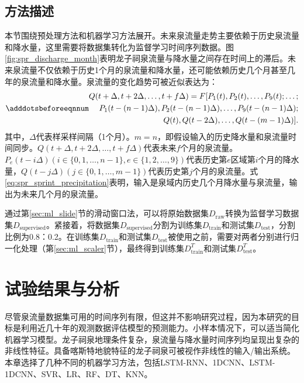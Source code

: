 \subsection{方法描述}\label{sec:spr_method}

本节围绕预处理方法和机器学习方法展开。未来泉流量走势主要依赖于历史泉流量和降水量，这里需要将数据集转化为监督学习时间序列数据。图\ref{fig:spr_discharge_month}表明龙子祠泉流量与降水量之间存在时间上的滞后。未来泉流量不仅依赖于历史1个月的泉流量和降水量，还可能依赖历史几个月甚至几年的泉流量和降水量。泉流量的变化趋势可被近似表达为：
\begin{equation}\adddotsbeforeeqnnum
  \label{eq:spr_sprint_precipitation}
  \begin{split}
    Q(t+\Delta,t+2\Delta,\ldots,t+f\Delta)=F[P_1(t),P_2(t),\ldots,P_9(t);\ldots;\\
    P_1(t-(n-1)\Delta),P_2(t-(n-1)\Delta),\ldots,P_9(t-(n-1)\Delta);\\
    Q(t),Q(t-2\Delta),\ldots,Q(t-(m-1)\Delta)].
  \end{split}
\end{equation}
其中，$\Delta$代表样采样间隔（1个月）。$m=n$，即假设输入的历史降水量和泉流量时间同步。$Q(t+\Delta,t+2\Delta,\ldots,t+f\Delta)$代表未来$f$个月的泉流量。$P_e(t-i\Delta)(i\in\{0,1,\ldots,n-1\},e\in\{1,2,\ldots,9\})$代表历史第$e$区域第$i$个月的降水量，$Q(t-j\Delta)(j\in\{0,1,\ldots,m-1\})$代表历史第$j$个月的泉流量。式\ref{eq:spr_sprint_precipitation}表明，输入是泉域内历史几个月降水量与泉流量，输出为未来几个月的泉流量。

通过第\ref{sec:ml_slide}节的滑动窗口法，可以将原始数据集$D_{\text{raw}}$转换为监督学习数据集$D_{\text{supervised}}$。紧接着，将数据集$D_{\text{supervised}}$分割为训练集$D_{\text{train}}$和测试集$D_{\text{test}}$，分割比例为0.8：0.2。在训练集$D_{\text{train}}$和测试集$D_{\text{test}}$被使用之前，需要对两者分别进行归一化处理（第\ref{sec:ml_scaler}节），最终得到训练集$D^T_{\text{train}}$和测试集$D^T_{\text{test}}$。

\section{试验结果与分析}\label{sec:spr_result}

尽管泉流量数据集可用的时间序列有限，但这并不影响研究过程，因为本研究的目标是利用近几十年的观测数据评估模型的预测能力。小样本情况下，可以适当简化机器学习模型。龙子祠泉地理条件复杂，泉流量与降水量时间序列均呈现出复杂的非线性特征。具备喀斯特地貌特征的龙子祠泉可被视作非线性的输入/输出系统。本章选择了几种不同的机器学习方法，包括LSTM-RNN、1DCNN、LSTM-1DCNN、SVR、LR、RF、DT、KNN。

